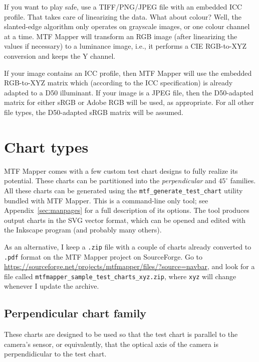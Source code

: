 \documentclass[a4paper]{article}
\begin{document}
If you want to play safe, use a TIFF/PNG/JPEG file with an embedded ICC profile.
That takes care of linearizing the data. What about colour? Well, the
slanted-edge algorithm only operates on grayscale images, or one colour
channel at a time. MTF Mapper will transform an RGB image (after linearizing
the values if necessary) to a luminance image, i.e., it performs a CIE
RGB-to-XYZ conversion and keeps the Y channel.

If your image contains an ICC profile, then MTF Mapper will use the embedded
RGB-to-XYZ matrix which (according to the ICC specification) is already
adapted to a D50 illuminant. If your image is a JPEG file, then the
D50-adapted matrix for either sRGB or Adobe RGB will be used, as appropriate.
For all other file types, the D50-adapted sRGB matrix will be assumed.

\newpage

\section{Chart types}
\label{sec:chart_types}
MTF Mapper comes with a few custom test chart designs to fully realize its
potential. These charts can be partitioned into the \emph{perpendicular} and
\emph{$45^\circ$} families. All these charts can be generated using the
\texttt{mtf\_generate\_test\_chart} utility bundled with MTF Mapper. This is a
command-line only tool; see Appendix~\ref{sec:manpages} for a full
description of its options. The tool produces output charts in the SVG
vector format, which can be opened and edited with the Inkscape program (and
probably many others).

As an alternative, I keep a \texttt{.zip} file with a couple of charts
already converted to \texttt{.pdf} format on the MTF Mapper project on
SourceForge. Go to
\url{https://sourceforge.net/projects/mtfmapper/files/?source=navbar}, and
look for a file called \newline
\texttt{mtfmapper\_sample\_test\_charts\_xyz.zip}, \newline
where \texttt{xyz} will change whenever I update the archive.

\subsection{Perpendicular chart family}
These charts are designed to be used so that the test chart is parallel to
the camera's sensor, or equivalently, that the optical axis of the camera is
perpendidicular to the test chart.
\end{document}
